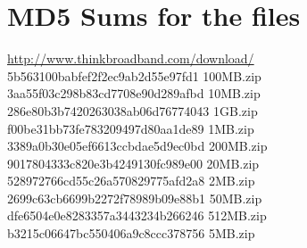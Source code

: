 \documentclass{sig-alternate-05-2015}
\begin{document}
\section{MD5 Sums for the files}
\url{http://www.thinkbroadband.com/download/}\\
5b563100babfef2f2ec9ab2d55e97fd1  100MB.zip\\
3aa55f03c298b83cd7708e90d289afbd  10MB.zip\\
286e80b3b7420263038ab06d76774043  1GB.zip\\
f00be31bb73fe783209497d80aa1de89  1MB.zip\\
3389a0b30e05ef6613ccbdae5d9ec0bd  200MB.zip\\
9017804333c820e3b4249130fc989e00  20MB.zip\\
528972766cd55c26a570829775afd2a8  2MB.zip\\
2699c63cb6699b2272f78989b09e88b1  50MB.zip\\
dfe6504e0e8283357a3443234b266246  512MB.zip\\
b3215c06647bc550406a9c8ccc378756  5MB.zip\\




\end{document}
